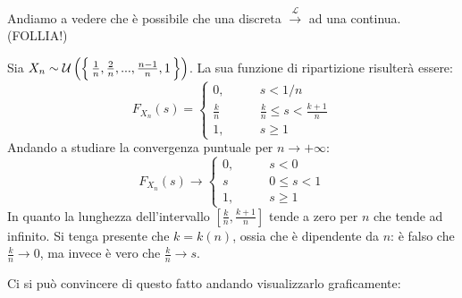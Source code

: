 \newpage
\begin{esempio}[\faWarning]
    Andiamo a vedere che è possibile che una discreta $\overset{\mathcal{L}}{\longrightarrow}$ ad una continua. (FOLLIA!)

    \bigskip Sia $X_n\sim \mathcal{U}\left(\Bigl\{\,\frac1n, \frac2n, ..., \frac{n-1}n, 1\,\Bigr\}\right)$. La sua funzione di ripartizione risulterà essere:
    \[F_{X_n}(s) = \begin{cases}
        0, \qquad & s< 1/n\\
        \frac{k}{n} &\frac kn\leq s< \frac{k+1}n\\
        1, & s\geq 1
    \end{cases}\]
    Andando a studiare la convergenza puntuale per $n\to+\infty:$
    \[F_{X_n}(s)\longrightarrow \begin{cases}
        0, \qquad & s<0\\
        s &0\leq s< 1\\
        1, & s\geq 1
    \end{cases}\]
    In quanto la lunghezza dell'intervallo $\left[\frac kn, \frac{k+1}n\right]$ tende a zero per $n$ che tende ad infinito. Si tenga presente che $k=k(n)$, ossia che è dipendente da $n$: è falso che $\frac{k}{n}\to 0$, ma invece è vero che $\frac{k}{n}\to s.$

    \medskip 
    Ci si può convincere di questo fatto andando visualizzarlo graficamente:

    \begin{figure}[H]
        \centering
\end{figure}
\end{esempio}
